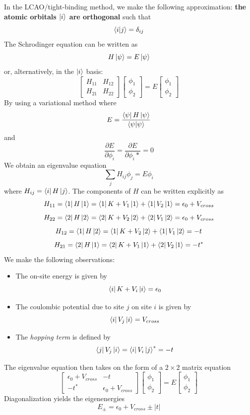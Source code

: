 \documentclass[10pt]{article}
\begin{document}
In the LCAO/tight-binding method, we make the following approximation: \textbf{the
atomic orbitals $\ket{i}$ are orthogonal} such that
$$
\bra{i}\ket{j} = \delta_{ij}
$$
The Schrodinger equation can be written as
$$
H\ket{\psi} = E\ket{\psi}
$$
or, alternatively, in the $\ket{i}$ basis:
$$
\begin{bmatrix}
  H_{11} & H_{12} \\
  H_{21} & H_{22}
\end{bmatrix}
\begin{bmatrix}
  \phi_{1} \\
  \phi_{2}
\end{bmatrix}
 = E \begin{bmatrix}
   \phi_{1} \\
   \phi_{2}
 \end{bmatrix}
$$
By using a variational method where
$$
E = \frac{\bra{\psi}H\ket{\psi}}{\bra{\psi}\ket{\psi}}
$$
and
$$
\frac{\partial E}{\partial \phi_{i}} = \frac{\partial E}{\partial \phi_{i}*} = 0
$$
We obtain an eigenvalue equation
$$
\sum_{j}H_{ij}\phi_{j} = E\phi_{i}
$$
where $H_{ij} = \bra{i}H\ket{j}$. The components of $H$ can be written explicitly as
$$
H_{11} = \bra{1}H\ket{1} = \bra{1}K+V_{1}\ket{1} + \bra{1}V_{2}\ket{1} = \epsilon_{0} + V_{cross}
$$
$$
H_{22} = \bra{2}H\ket{2} = \bra{2}K+V_{2}\ket{2} + \bra{2}V_{1}\ket{2} = \epsilon_{0} + V_{cross}
$$$$
H_{12} = \bra{1}H\ket{2} = \bra{1}K+V_{2}\ket{2} + \bra{1}V_{1}\ket{2} = -t
$$$$
H_{21} = \bra{2}H\ket{1} = \bra{2}K+V_{1}\ket{1} + \bra{2}V_{2}\ket{1} = -t^*
$$
We make the following observations:
\begin{itemize}
  \item The on-site energy is given by
  $$\bra{i}K + V_{i}\ket{i} = \epsilon_{0}$$
  \item The coulombic potential due to site $j$ on site $i$ is given by
  $$\bra{i}V_{j}\ket{i} = V_{cross}$$
  \item The \emph{hopping term} is defined by
  $$\bra{j}V_{j}\ket{i} = \bra{i}V_{i}\ket{j}^* = -t$$
\end{itemize}

The eigenvalue equation then takes on the form of a $2\times 2$ matrix equation
$$
\begin{bmatrix}
  \epsilon_{0} + V_{cross} & -t \\
  -t^{*} & \epsilon_{0} + V_{cross}
\end{bmatrix}
\begin{bmatrix}
  \phi_{1} \\
  \phi_{2}
\end{bmatrix}
= E\begin{bmatrix} \phi_{1} \\ \phi_{2} \end{bmatrix}
$$
Diagonalization yields the eigenenergies
$$
E_{\pm} = \epsilon_{0} + V_{cross} \pm |t|$$
\end{document}
